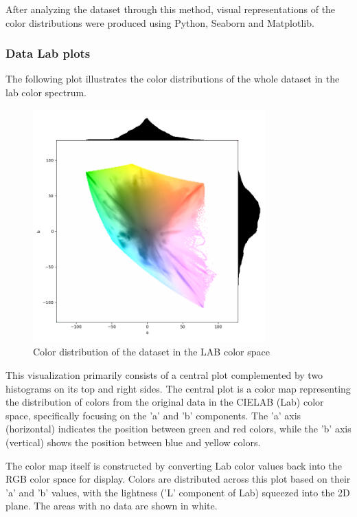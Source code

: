     After analyzing the dataset through this method, visual representations of the color distributions were produced using Python, Seaborn and Matplotlib. 
    
    \subsubsection{Data Lab plots}

    The following plot illustrates the color distributions of the whole dataset in the lab color spectrum.


    \begin{figure}[H]
        \centering
        \includegraphics[width=0.8\textwidth]{../code/dataAnalysis/plots/lab/DataCombined_lab_log.png}
        \caption{Color distribution of the dataset in the LAB color space}
        \label{fig:example}
    \end{figure}
    
    This visualization primarily consists of a central plot complemented by two histograms on its top and right sides. The central plot is a color map representing the distribution of colors from the original data in the CIELAB (Lab) color space, specifically focusing on the 'a' and 'b' components. The 'a' axis (horizontal) indicates the position between green and red colors, while the 'b' axis (vertical) shows the position between blue and yellow colors.

    The color map itself is constructed by converting Lab color values back into the RGB color space for display. Colors are distributed across this plot based on their 'a' and 'b' values, with the lightness ('L' component of Lab) squeezed into the 2D plane. The areas with no data are shown in white.

